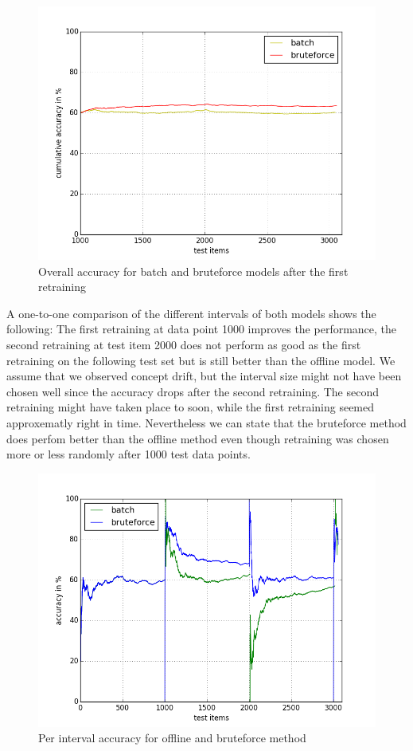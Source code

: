 \documentclass{article} %
\begin{document}
\begin{figure}[htbp]
  \centering
  \includegraphics[scale=0.5]{./plots/overallBatchBruteforce.png}
  \caption{Overall accuracy for batch and bruteforce models after the first retraining}
\end{figure}
A one-to-one comparison of the different intervals of both models shows the following: The first retraining at data point 1000 improves the performance, the second retraining at test item 2000 does not perform as good as the first retraining on the following test set but is still better than the offline model. We assume that we observed concept drift, but the interval size might not have been chosen well since the accuracy drops after the second retraining. The second retraining might have taken place to soon, while the first retraining seemed approxematly right in time. Nevertheless we can state that the bruteforce method does  perfom better than the offline method even though retraining was chosen more or less randomly after 1000 test data points.

\begin{figure}[htbp]
  \centering
  \includegraphics[scale=0.5]{./plots/bruteforce_batch.png}
  \caption{Per interval accuracy for offline and bruteforce method}
\end{figure}
\end{document}
